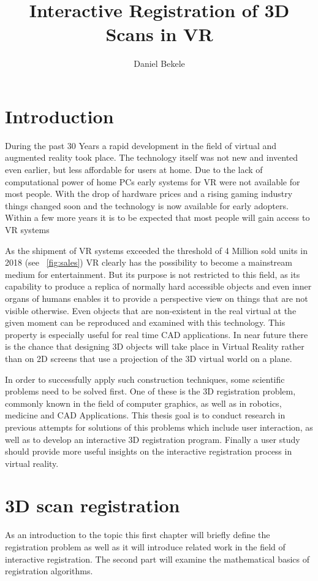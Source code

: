 \documentclass[hyperref,english,bachelorofscience,bibnum,twoside]{cgvpub}
\author{Daniel Bekele}
\title{Interactive Registration of 3D Scans in VR}
\begin{document}
\chapter{Introduction}
During the past 30 Years a rapid development in the field of  virtual and augmented reality took place. The technology itself was not new and invented even earlier, but less affordable for users at home. Due to the lack of computational power of home PCs early systems for VR were not available for most people. With the drop of hardware prices and a rising gaming industry things changed soon and the technology is now available for early adopters. Within a few more years it is to be expected that most people will gain access to VR systems

As the shipment of VR systems exceeded the threshold of 4 Million sold units in 2018 (see ~\ref{fig:sales})\cite{statisticaVR18} VR clearly has the possibility to become a mainstream medium for entertainment. But its purpose is not restricted to this field, as its capability to produce a replica of normally hard accessible objects and even inner organs of humans enables it to provide a perspective view on things that are not visible otherwise. Even objects that are non-existent in the real virtual at the given moment can be reproduced and examined with this technology. This property is especially useful for real time CAD applications. In near future there is the chance that designing 3D objects will take place in Virtual Reality rather than on 2D screens that use a projection of the 3D virtual world on a plane.

In order to successfully apply such construction techniques, some scientific problems need to be solved first. One of these is the 3D registration problem, commonly known in the field of computer graphics, as well as in robotics, medicine and CAD Applications.
This thesis goal is to conduct research in previous attempts for solutions of this problems which include user interaction, as well as to develop an interactive 3D registration program. Finally a user study should provide more useful insights on the interactive registration process in virtual reality.

\chapter{3D scan registration}

As an introduction to the topic this first chapter will briefly define the registration problem as well as it will introduce related work in the field of interactive registration. The second part will examine the mathematical basics of registration algorithms.
\end{document}
